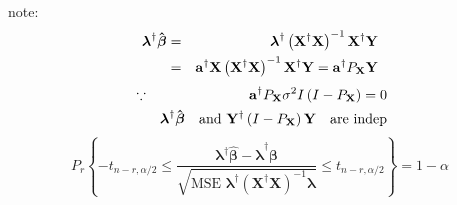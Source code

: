 \documentclass{article}
\begin{document}
note:%
\begin{eqnarray*}
\mathbf{\lambda }^{\dagger }\mathbf{\hat{\beta}} &=&\mathbf{\lambda }%
^{\dagger }\left( \mathbf{X}^{\dagger }\mathbf{X}\right) ^{-1}\mathbf{X}%
^{\dagger }\mathbf{Y} \\
&=&\mathbf{a}^{\dagger }\mathbf{X}\left( \mathbf{X}^{\dagger }\mathbf{X}%
\right) ^{-1}\mathbf{X}^{\dagger }\mathbf{Y}=\mathbf{a}^{\dagger }P_{\mathbf{%
X}}\mathbf{Y}
\end{eqnarray*}%
\begin{eqnarray*}
&\because &\mathbf{a}^{\dagger }P_{\mathbf{X}}\sigma ^{2}I\left( I-P_{%
\mathbf{X}}\right) =0 \\
&\therefore &\mathbf{\lambda }^{\dagger }\mathbf{\hat{\beta}}\text{ and }%
\mathbf{Y}^{\dagger }\left( I-P_{\mathbf{X}}\right) \mathbf{Y}\text{ are
indep}
\end{eqnarray*}%
\begin{equation*}
P_{r}\left\{ -t_{n-r,\alpha /2}\leq \frac{\mathbf{\lambda }^{\dagger }%
\mathbf{\hat{\beta}-\lambda }^{\dagger }\mathbf{\beta }}{\sqrt{\text{MSE }%
\mathbf{\lambda }^{\dagger }\left( \mathbf{X}^{\dagger }\mathbf{X}\right)
^{-1}\mathbf{\lambda }}}\leq t_{n-r,\alpha /2}\right\} =1-\alpha
\end{equation*}
\end{document}
